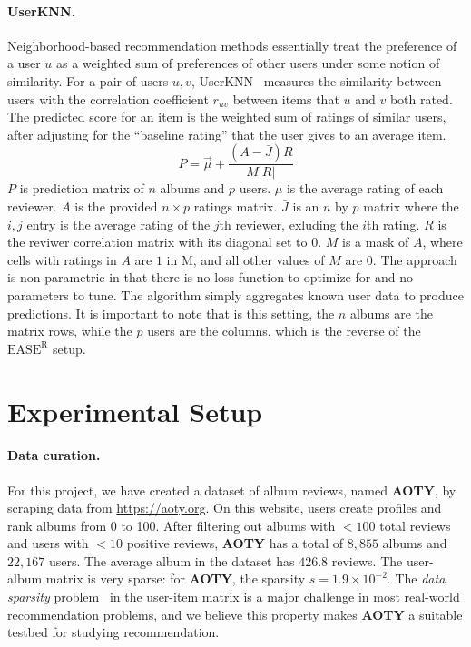 \documentclass{article}
\newcommand{\aoty}{{\bf AOTY}\xspace}
\newcommand{\card}[1]{\ensuremath{\lvert {#1} \rvert}}
\newcommand{\easer}{$\text{EASE}^\text{R}$\xspace}
\newcommand{\userknn}{UserKNN\xspace}
\begin{document}
\paragraph*{\userknn.}
Neighborhood-based recommendation methods essentially treat the preference of a
 user $u$ as a weighted sum of preferences of other users under some notion of
 similarity.
For a pair of users $u, v$,
 \userknn~\citep{resnickGroupLensOpenArchitecture1994} measures the similarity
 between users with the correlation coefficient $r_{uv}$ between items that $u$
 and $v$ both rated.
The predicted score for an item is the weighted sum of ratings of similar
 users, after adjusting for the ``baseline rating'' that the user gives to an
 average item.
\begin{equation}
P = \vec{\mu} + \frac{(A - \bar J)R}{M \card{R}} \end{equation}  $P$ is
 prediction matrix of $n$ albums and $p$ users.
$\mu$ is the average
rating
of each reviewer. $A$ is the provided $n \times p$ ratings matrix. $\bar J$ is
an $n$
by $p$
matrix where the $i,j$ entry is the average rating of the $j$th reviewer,
exluding the $i$th
rating. $R$ is the reviwer correlation matrix with its diagonal set to 0. $M$
is
a mask of
$A$, where cells with ratings in $A$ are $1$ in M, and all other values of $M$
are 0.
The approach is non-parametric in that there is no loss function to optimize
 for and no parameters to tune.
The algorithm simply aggregates known user data to produce predictions.
It is important to note that is this setting, the $n$ albums are the matrix
 rows, while the $p$ users are the columns, which is the reverse of the \easer
 setup.

\section{Experimental Setup}
\label{sec:setup}
\paragraph*{Data curation.}
For this project, we have created a dataset of album reviews, named \aoty, by
 scraping data from \url{https://aoty.org}.
On this website, users create profiles and rank albums from 0 to 100.
After filtering out albums with $<100$ total reviews and users with $<10$
 positive reviews, \aoty has a total of $8,855$ albums and $22,167$ users.
The average album in the dataset has $426.8$ reviews.
The user-album matrix is very sparse: for \aoty, the sparsity $s = 1.9 \times
	 10^{-2}$.
The {\em data sparsity} problem~\citep{suSurveyCollaborativeFiltering2009} in
 the user-item matrix is a major challenge in most real-world recommendation
 problems, and we believe this property makes \aoty a suitable testbed for
 studying recommendation.
\end{document}
